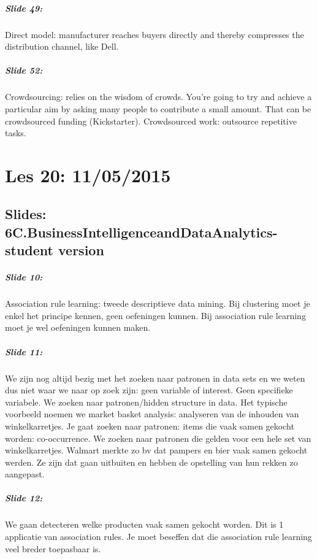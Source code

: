 \documentclass[10pt,a4paper]{report}
\begin{document}
\paragraph{Slide 49:}Direct model: manufacturer reaches buyers directly and thereby compresses the distribution channel, like Dell.

\paragraph{Slide 52:}Crowdsourcing: relies on the wisdom of crowds. You're going to try and achieve a particular aim by asking many people to contribute a small amount. That can be crowdsourced funding (Kickstarter). Crowdsourced work: outsource repetitive tasks.

\chapter{Les 20: 11/05/2015}
\section{Slides: 6C.BusinessIntelligenceandDataAnalytics-student version}

\paragraph{Slide 10:}Association rule learning: tweede descriptieve data mining. Bij clustering moet je enkel het principe kennen, geen oefeningen kunnen. Bij association rule learning moet je wel oefeningen kunnen maken.

\paragraph{Slide 11:}We zijn nog altijd bezig met het zoeken naar patronen in data sets en we weten dus niet waar we naar op zoek zijn: geen variable of interest. Geen specifieke variabele. We zoeken naar patronen/hidden structure in data. Het typische voorbeeld noemen we market basket analysis: analyseren van de inhouden van winkelkarretjes. Je gaat zoeken naar patronen: items die vaak samen gekocht worden: co-occurrence. We zoeken naar patronen die gelden voor een hele set van winkelkarretjes. Walmart merkte zo bv dat pampers en bier vaak samen gekocht werden. Ze zijn dat gaan uitbuiten en hebben de opstelling van hun rekken zo aangepast.

\paragraph{Slide 12:}We gaan detecteren welke producten vaak samen gekocht worden. Dit is 1 applicatie van association rules. Je moet beseffen dat die association rule learning veel breder toepasbaar is.
\end{document}
